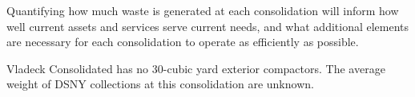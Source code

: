 
    Quantifying how much waste is generated at each consolidation will inform how well current assets and services serve current needs, and what additional elements are necessary for each consolidation to operate as efficiently as possible.
    
    Vladeck Consolidated has no 30-cubic yard exterior compactors. The average weight of DSNY collections at this consolidation are unknown.